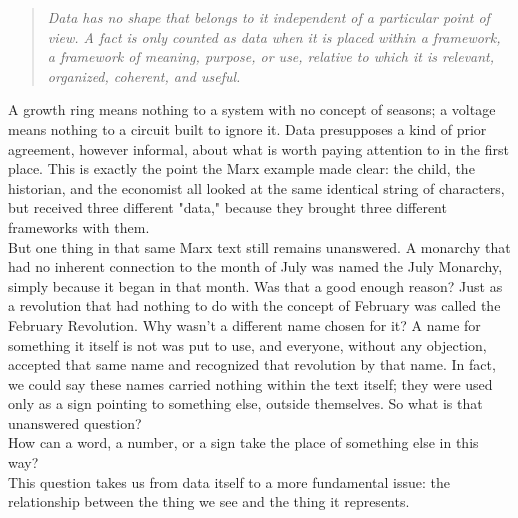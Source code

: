 \begin{quote}
\itshape
Data has no shape that belongs to it independent of a particular point of view. A fact is only counted as data when it is placed within a framework, a framework of meaning, purpose, or use, relative to which it is relevant, organized, coherent, and useful.
\end{quote}
A growth ring means nothing to a system with no concept of seasons; a voltage means nothing to a circuit built to ignore it. Data presupposes a kind of prior agreement, however informal, about what is worth paying attention to in the first place. This is exactly the point the Marx example made clear: the child, the historian, and the economist all looked at the same identical string of characters, but received three different "data," because they brought three different frameworks with them.\\
But one thing in that same Marx text still remains unanswered. A monarchy that had no inherent connection to the month of July was named the July Monarchy, simply because it began in that month. Was that a good enough reason? Just as a revolution that had nothing to do with the concept of February was called the February Revolution. Why wasn't a different name chosen for it? A name for something it itself is not was put to use, and everyone, without any objection, accepted that same name and recognized that revolution by that name.
In fact, we could say these names carried nothing within the text itself; they were used only as a sign pointing to something else, outside themselves. So what is that unanswered question?\\
How can a word, a number, or a sign take the place of something else in this way?\\
This question takes us from data itself to a more fundamental issue: the relationship between the thing we see and the thing it represents.